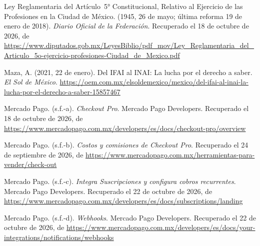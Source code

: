 \documentclass[12pt, a4paper]{article}
\begin{document}
\begin{list}{}{\setlength{\leftmargin}{1.27cm}\setlength{\itemindent}{-1.27cm}%
  \setlength{\labelwidth}{0pt}\setlength{\labelsep}{0pt}\setlength{\itemsep}{6pt}}
\item Ley Reglamentaria del Artículo~5° Constitucional, Relativo
  al Ejercicio de las Profesiones en la Ciudad de México.
  (1945, 26 de mayo; última reforma 19 de enero de 2018).
  \textit{Diario Oficial de la Federación}. Recuperado el 18 de octubre de 2026, de \url{https://www.diputados.gob.mx/LeyesBiblio/pdf_mov/Ley_Reglamentaria_del_Articulo_5o-ejercicio-profesiones-Ciudad_de_Mexico.pdf}


\item Maza, A. (2021, 22 de enero). Del IFAI al INAI:
  La lucha por el derecho a saber. \textit{El Sol de México}.
  \url{https://oem.com.mx/elsoldemexico/mexico/del-ifai-al-inai-la-lucha-por-el-derecho-a-saber-15857467}

  
\item Mercado Pago. (s.f.-a). \textit{Checkout Pro}. Mercado Pago Developers.
Recuperado el 18 de octubre de 2026, de \url{https://www.mercadopago.com.mx/developers/es/docs/checkout-pro/overview}

  
 \item Mercado Pago. (s.f.-b). \textit{Costos y comisiones de Checkout
  Pro}. Recuperado el 24 de septiembre de 2026, de
\url{https://www.mercadopago.com.mx/herramientas-para-vender/check-out}
 
 
\item Mercado Pago. (s.f.-c). \textit{Integra Suscripciones y configura
  cobros recurrentes}. Mercado Pago Developers. Recuperado el 22 de octubre de 2026, de \url{https://www.mercadopago.com.mx/developers/es/docs/subscriptions/landing}
 
 
\item Mercado Pago. (s.f.-d). \textit{Webhooks}. Mercado Pago Developers.
  Recuperado el 22 de octubre de 2026, de \url{https://www.mercadopago.com.mx/developers/es/docs/your-integrations/notifications/webhooks}
 

\end{list}
\end{document}
